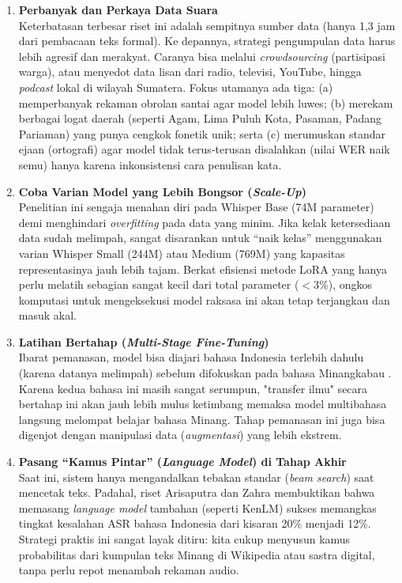 \begin{enumerate}

    \item \textbf{Perbanyak dan Perkaya Data Suara} \\
    Keterbatasan terbesar riset ini adalah sempitnya sumber data (hanya 1,3 jam dari pembacaan teks formal). Ke depannya, strategi pengumpulan data harus lebih agresif dan merakyat. Caranya bisa melalui \textit{crowdsourcing} (partisipasi warga), atau menyedot data lisan dari radio, televisi, YouTube, hingga \textit{podcast} lokal di wilayah Sumatera. Fokus utamanya ada tiga: (a) memperbanyak rekaman obrolan santai agar model lebih luwes; (b) merekam berbagai logat daerah (seperti Agam, Lima Puluh Kota, Pasaman, Padang Pariaman) yang punya cengkok fonetik unik; serta (c) merumuskan standar ejaan (ortografi) agar model tidak terus-terusan disalahkan (nilai WER naik semu) hanya karena inkonsistensi cara penulisan kata.

    \item \textbf{Coba Varian Model yang Lebih Bongsor (\textit{Scale-Up})} \\
    Penelitian ini sengaja menahan diri pada Whisper Base (74M parameter) demi menghindari \textit{overfitting} pada data yang minim. Jika kelak ketersediaan data sudah melimpah, sangat disarankan untuk ``naik kelas'' menggunakan varian Whisper Small (244M) atau Medium (769M) yang kapasitas representasinya jauh lebih tajam. Berkat efisiensi metode LoRA yang hanya perlu melatih sebagian sangat kecil dari total parameter ($<$3\%), ongkos komputasi untuk mengeksekusi model raksasa ini akan tetap terjangkau dan masuk akal.

    \item \textbf{Latihan Bertahap (\textit{Multi-Stage Fine-Tuning})} \\
    Ibarat pemanasan, model bisa diajari bahasa Indonesia terlebih dahulu (karena datanya melimpah) sebelum difokuskan pada bahasa Minangkabau \cite{pillai2024multistage}. Karena kedua bahasa ini masih sangat serumpun, "transfer ilmu" secara bertahap ini akan jauh lebih mulus ketimbang memaksa model multibahasa langsung melompat belajar bahasa Minang. Tahap pemanasan ini juga bisa digenjot dengan manipulasi data (\textit{augmentasi}) yang lebih ekstrem.

    \item \textbf{Pasang ``Kamus Pintar'' (\textit{Language Model}) di Tahap Akhir} \\
    Saat ini, sistem hanya mengandalkan tebakan standar (\textit{beam search}) saat mencetak teks. Padahal, riset Arisaputra dan Zahra \cite{arisaputra2022xlsr53} membuktikan bahwa memasang \textit{language model} tambahan (seperti KenLM) sukses memangkas tingkat kesalahan ASR bahasa Indonesia dari kisaran 20\% menjadi 12\%. Strategi praktis ini sangat layak ditiru: kita cukup menyusun kamus probabilitas dari kumpulan teks Minang di Wikipedia atau sastra digital, tanpa perlu repot menambah rekaman audio.


\end{enumerate}
